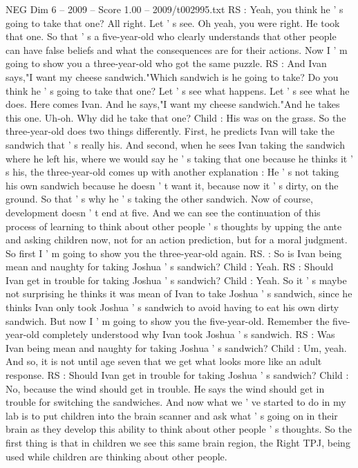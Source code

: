 \begin{textsample}{NEG Dim 6 – 2009 – Score 1.00 – 2009/t002995.txt}
RS : Yeah, you think he ' s going to take that one?
All right.
Let ' s see.
Oh yeah, you were right.
He took that one.
So that ' s a five-year-old who clearly understands that other people can have false beliefs and what the consequences are for their actions.
Now I ' m going to show you a three-year-old who got the same puzzle.
RS : And Ivan says,"I want my cheese sandwich."Which sandwich is he going to take?
Do you think he ' s going to take that one?
Let ' s see what happens.
Let ' s see what he does.
Here comes Ivan.
And he says,"I want my cheese sandwich."And he takes this one.
Uh-oh.
Why did he take that one?
Child : His was on the grass.
So the three-year-old does two things differently.
First, he predicts Ivan will take the sandwich that ' s really his.
And second, when he sees Ivan taking the sandwich where he left his, where we would say he ' s taking that one because he thinks it ' s his, the three-year-old comes up with another explanation : He ' s not taking his own sandwich because he doesn ' t want it, because now it ' s dirty, on the ground.
So that ' s why he ' s taking the other sandwich.
Now of course, development doesn ' t end at five.
And we can see the continuation of this process of learning to think about other people ' s thoughts by upping the ante and asking children now, not for an action prediction, but for a moral judgment.
So first I ' m going to show you the three-year-old again.
RS. : So is Ivan being mean and naughty for taking Joshua ' s sandwich?
Child : Yeah.
RS : Should Ivan get in trouble for taking Joshua ' s sandwich?
Child : Yeah.
So it ' s maybe not surprising he thinks it was mean of Ivan to take Joshua ' s sandwich, since he thinks Ivan only took Joshua ' s sandwich to avoid having to eat his own dirty sandwich.
But now I ' m going to show you the five-year-old.
Remember the five-year-old completely understood why Ivan took Joshua ' s sandwich.
RS : Was Ivan being mean and naughty for taking Joshua ' s sandwich?
Child : Um, yeah.
And so, it is not until age seven that we get what looks more like an adult response.
RS : Should Ivan get in trouble for taking Joshua ' s sandwich?
Child : No, because the wind should get in trouble.
He says the wind should get in trouble for switching the sandwiches.
And now what we ' ve started to do in my lab is to put children into the brain scanner and ask what ' s going on in their brain as they develop this ability to think about other people ' s thoughts.
So the first thing is that in children we see this same brain region, the Right TPJ, being used while children are thinking about other people.

\end{textsample}
